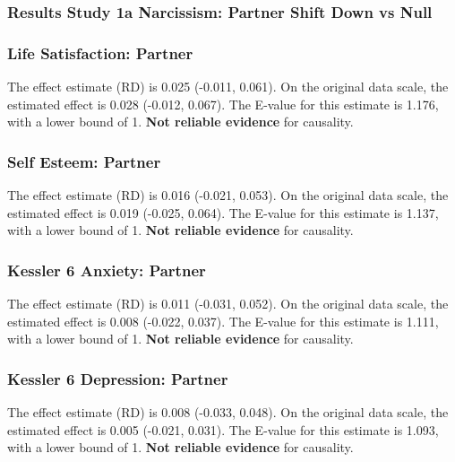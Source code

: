 \documentclass[
  singlecolumn]{article}
\begin{document}
\newpage{}

\subsubsection{Results Study 1a Narcissism: Partner Shift Down vs
Null}\label{results-study-1a-narcissism-partner-shift-down-vs-null}

\subsubsection{Life Satisfaction:
Partner}\label{life-satisfaction-partner-6}

The effect estimate (RD) is 0.025 (-0.011, 0.061). On the original data
scale, the estimated effect is 0.028 (-0.012, 0.067). The E-value for
this estimate is 1.176, with a lower bound of 1. \textbf{Not reliable
evidence} for causality.

\subsubsection{Self Esteem: Partner}\label{self-esteem-partner-6}

The effect estimate (RD) is 0.016 (-0.021, 0.053). On the original data
scale, the estimated effect is 0.019 (-0.025, 0.064). The E-value for
this estimate is 1.137, with a lower bound of 1. \textbf{Not reliable
evidence} for causality.

\subsubsection{Kessler 6 Anxiety:
Partner}\label{kessler-6-anxiety-partner-6}

The effect estimate (RD) is 0.011 (-0.031, 0.052). On the original data
scale, the estimated effect is 0.008 (-0.022, 0.037). The E-value for
this estimate is 1.111, with a lower bound of 1. \textbf{Not reliable
evidence} for causality.

\subsubsection{Kessler 6 Depression:
Partner}\label{kessler-6-depression-partner-6}

The effect estimate (RD) is 0.008 (-0.033, 0.048). On the original data
scale, the estimated effect is 0.005 (-0.021, 0.031). The E-value for
this estimate is 1.093, with a lower bound of 1. \textbf{Not reliable
evidence} for causality.
\end{document}
